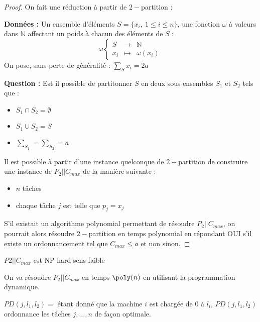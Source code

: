 \documentclass[a4paper, 11pt]{thesis}
\begin{document}
\begin{proof}
On fait une réduction à partir de $2-$partition :

\textbf{Données :} Un ensemble d'éléments $S = \{x_i,~ 1 \leq i \leq n\}$, une fonction $\omega$ à
valeurs dans $\mathbb{N}$ affectant un poids à chacun des éléments de $S$ :
\begin{displaymath}
    \omega \left \lbrace \begin{array}{rcl}
        S & \longrightarrow & \mathbb{N}\\
        x_i & \longmapsto & \omega(x_i)
    \end{array} \right .
\end{displaymath}
On pose, sans perte de généralité : $\sum_S x_i = 2a$

\textbf{Question :} Est il possible de partitonner $S$ en deux sous ensembles $S_1$ et $S_2$ tels
que : \begin{itemize}
    \item $S_1 \cap S_2 = \emptyset$ 
    \item $S_1 \cup S_2 = S$
    \item $\sum_{S_1} = \sum_{S_2} = a$\\
\end{itemize}

Il est possible à partir d'une instance quelconque de $2-$partition de construire une instance de
$P_2| | C_{max}$ de la manière suivante : \begin{itemize}
    \item $n$ tâches
    \item chaque tâche $j$ est telle que $p_j = x_j$\\
\end{itemize}
S'il existait un algorithme polynomial permettant de résoudre $P_2| | C_{max}$, on pourrait alors
résoudre $2-$partition en temps polynomial en répondant OUI s'il existe un ordonnancement tel que
$C_{max} \leq a$ et non sinon.
\end{proof}

\begin{rmq}
    $P2 || C_{max}$ est NP-hard sens faible
\end{rmq}

On va résoudre $\overline{P_2 | | C_{max}}$ en temps $\poly(n)$ en utilisant la programmation dynamique.

$PD(j, l_1, l_2) =$ étant donné que la machine $i$ est chargée de $0$ à $l_i$, $PD(j, l_1, l_2)$
ordonnance les tâches $j, \dots, n$ de façon optimale.
\end{document}
